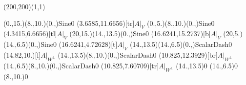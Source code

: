 \unitlength=1bp%

\begin{feynartspicture}(200,200)(1,1)

\FADiagram{}
\FAProp(0.,15.)(8.,10.)(0.,){Sine}{0}
\FALabel(3.6585,11.6656)[tr]{$A|_V$}
\FAProp(0.,5.)(8.,10.)(0.,){Sine}{0}
\FALabel(4.3415,6.6656)[tl]{$A|_V$}
\FAProp(20,15.)(14.,13.5)(0.,){Sine}{0}
\FALabel(16.6241,15.2737)[b]{$A|_V$}
\FAProp(20,5.)(14.,6.5)(0.,){Sine}{0}
\FALabel(16.6241,4.72628)[t]{$A|_V$}
\FAProp(14.,13.5)(14.,6.5)(0.,){ScalarDash}{0}
\FALabel(14.82,10.)[l]{$A|_{W^\perp}$}
\FAProp(14.,13.5)(8.,10.)(0.,){ScalarDash}{0}
\FALabel(10.825,12.3929)[br]{$A|_{W^\perp}$}
\FAProp(14.,6.5)(8.,10.)(0.,){ScalarDash}{0}
\FALabel(10.825,7.60709)[tr]{$A|_{W^\perp}$}
\FAVert(14.,13.5){0}
\FAVert(14.,6.5){0}
\FAVert(8.,10.){0}
\end{feynartspicture}

